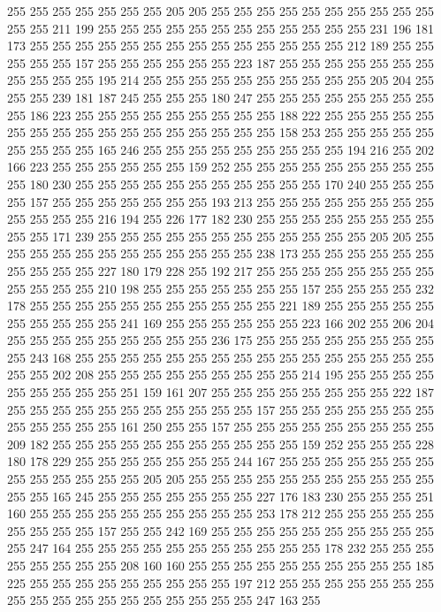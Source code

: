 255 255 255 255 255 255 255 205 205 255 255 255 255 255 255 255 255 255 255 255
255 211 199 255 255 255 255 255 255 255 255 255 255 255 255 231 196 181 173 255
255 255 255 255 255 255 255 255 255 255 255 255 255 212 189 255 255 255 255 255
157 255 255 255 255 255 255 223 187 255 255 255 255 255 255 255 255 255 255 255
195 214 255 255 255 255 255 255 255 255 255 255 205 204 255 255 255 239 181 187
245 255 255 255 180 247 255 255 255 255 255 255 255 255 255 186 223 255 255 255
255 255 255 255 255 255 188 222 255 255 255 255 255 255 255 255 255 255 255 255
255 255 255 255 255 158 253 255 255 255 255 255 255 255 255 255 165 246 255 255
255 255 255 255 255 255 255 194 216 255 202 166 223 255 255 255 255 255 255 159
252 255 255 255 255 255 255 255 255 255 255 180 230 255 255 255 255 255 255 255
255 255 255 255 170 240 255 255 255 255 157 255 255 255 255 255 255 255 193 213
255 255 255 255 255 255 255 255 255 255 255 255 216 194 255 226 177 182 230 255
255 255 255 255 255 255 255 255 255 171 239 255 255 255 255 255 255 255 255 255
255 255 255 205 205 255 255 255 255 255 255 255 255 255 255 255 255 238 173 255
255 255 255 255 255 255 255 255 255 227 180 179 228 255 192 217 255 255 255 255
255 255 255 255 255 255 255 255 210 198 255 255 255 255 255 255 255 157 255 255
255 255 232 178 255 255 255 255 255 255 255 255 255 255 255 221 189 255 255 255
255 255 255 255 255 255 255 241 169 255 255 255 255 255 255 223 166 202 255 206
204 255 255 255 255 255 255 255 255 255 236 175 255 255 255 255 255 255 255 255
255 243 168 255 255 255 255 255 255 255 255 255 255 255 255 255 255 255 255 255
255 202 208 255 255 255 255 255 255 255 255 255 214 195 255 255 255 255 255 255
255 255 255 251 159 161 207 255 255 255 255 255 255 255 255 222 187 255 255 255
255 255 255 255 255 255 255 255 157 255 255 255 255 255 255 255 255 255 255 255
255 161 250 255 255 157 255 255 255 255 255 255 255 255 255 209 182 255 255 255
255 255 255 255 255 255 255 255 159 252 255 255 255 228 180 178 229 255 255 255
255 255 255 255 244 167 255 255 255 255 255 255 255 255 255 255 255 255 255 205
205 255 255 255 255 255 255 255 255 255 255 255 255 255 165 245 255 255 255 255
255 255 255 227 176 183 230 255 255 255 251 160 255 255 255 255 255 255 255 255
255 255 253 178 212 255 255 255 255 255 255 255 255 255 157 255 255 242 169 255
255 255 255 255 255 255 255 255 255 255 247 164 255 255 255 255 255 255 255 255
255 255 255 178 232 255 255 255 255 255 255 255 255 208 160 160 255 255 255 255
255 255 255 255 255 255 185 225 255 255 255 255 255 255 255 255 255 197 212 255
255 255 255 255 255 255 255 255 255 255 255 255 255 255 255 255 255 247 163 255
